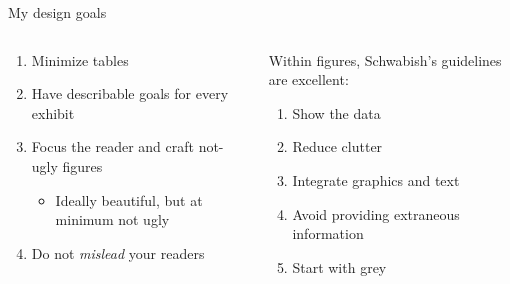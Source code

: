 \documentclass[notes,11pt, aspectratio=169]{beamer}
\newcommand\1{\operatorname{\mathbbm{1}}\indicatorfence}
\begin{document}
\begin{frame}{My design goals}
  \begin{columns}[T] %
    \begin{column}{.6\textwidth}
      \begin{enumerate}
      \item Minimize tables 
      \item Have describable goals for every exhibit
      \item Focus the reader and craft not-ugly figures
        \begin{itemize}
        \item Ideally beautiful, but at minimum not ugly
        \end{itemize}
      \item Do not \emph{mislead} your readers
      \end{enumerate}
      \pause
  \end{column}%
  \hfill%
  \begin{column}{.4\textwidth}
    Within figures, Schwabish's guidelines are excellent:
    \begin{enumerate}
    \item Show the data
    \item Reduce clutter
    \item Integrate graphics and text
    \item Avoid providing extraneous information
    \item Start with grey
    \end{enumerate}
  \end{column}
\end{columns}
\end{frame}
\end{document}
